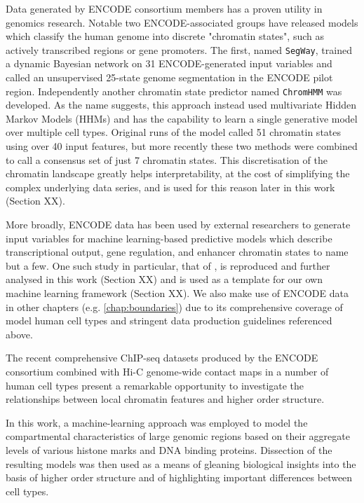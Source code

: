 \documentclass[a4paper,10pt,oneside]{book}
\begin{document}
Data generated by ENCODE consortium members has a proven utility in genomics research. 
Notable two ENCODE-associated groups have released models which classify the human genome into discrete "chromatin states", such as actively transcribed regions or gene promoters. The first, named \texttt{SegWay}, trained a dynamic Bayesian network on  31 ENCODE-generated input variables and called an unsupervised 25-state genome segmentation in the ENCODE pilot region.\cite{Hoffman2012} Independently another chromatin state predictor named \texttt{ChromHMM} was developed.\cite{Ernst2011, Ernst2012} As the name suggests, this approach instead used multivariate Hidden Markov Models (HHMs) and has the capability to learn a single generative model over multiple cell types. Original runs of the model called 51 chromatin states using over 40 input features,\cite{Ernst2010a} but more recently these two methods were combined to call a consensus set of just 7 chromatin states.\cite{Hoffman2013} This discretisation of the chromatin landscape greatly helps interpretability, at the cost of simplifying the complex underlying data series, and is used for this reason later in this work (Section XX). 

More broadly, ENCODE data has been used by external researchers to generate input variables for machine learning-based predictive models which describe transcriptional output,\cite{Cheng2011} gene regulation,\cite{Althammer2012} and enhancer chromatin states\cite{Rajagopal2013} to name but a few. One such study in particular, that of \citet{Dong2012}, is reproduced and further analysed in this work (Section XX) and is used as a template for our own machine learning framework (Section XX). We also make use of ENCODE data in other chapters (e.g. \ref{chap:boundaries}) due to its comprehensive coverage of model human cell types and stringent data production guidelines referenced above.


The recent comprehensive ChIP-seq datasets
produced by the ENCODE consortium\cite{Dunham2012} combined with Hi-C
genome-wide contact maps in a number of human cell
types\cite{Dixon2012, Lieberman2009, Kalhor2012} present a remarkable
opportunity to investigate the relationships between local
chromatin features and higher order structure.

In this work, a machine-learning approach was employed to model the
compartmental characteristics of large genomic regions based on their
aggregate levels of various histone marks and DNA binding
proteins. Dissection of the resulting models was then used as a
means of gleaning biological insights into the basis of higher order
structure and of highlighting important differences between cell types.
\end{document}
